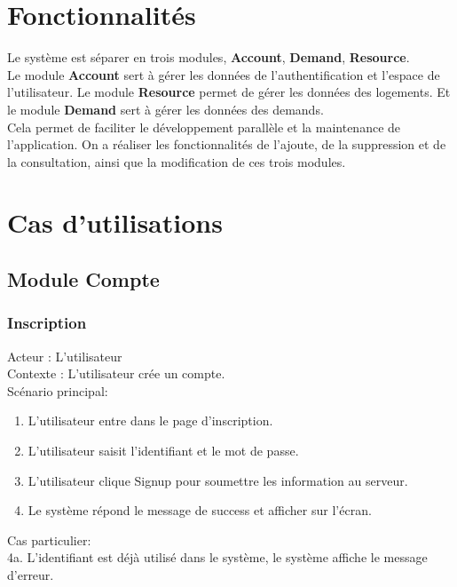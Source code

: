 \documentclass[14px]{article}
\begin{document}
\section{Fonctionnalités}
Le système est séparer en trois modules, \textbf{Account}, \textbf{Demand}, \textbf{Resource}. \\
Le module \textbf{Account} sert à gérer les données de l'authentification et l'espace de l'utilisateur. Le module \textbf{Resource} permet de gérer les données des logements. Et le module \textbf{Demand} sert à gérer les données des demands.\\
Cela permet de faciliter le développement parallèle et la maintenance de l'application. On a réaliser les fonctionnalités de l'ajoute, de la suppression et de la consultation, ainsi que la modification de ces trois modules. 


\section{Cas d'utilisations}
\subsection{Module Compte}
\subsubsection{Inscription}
Acteur : L'utilisateur\\
Contexte : L'utilisateur crée un compte.\\
Scénario principal:
\begin{enumerate}
	\item L'utilisateur entre dans le page d'inscription.
	\item L'utilisateur saisit l'identifiant et le mot de passe.
	\item L'utilisateur clique Signup pour soumettre les information au serveur.
	\item Le système répond le message de success et afficher sur l'écran.
\end{enumerate}
Cas particulier:\\
4a. L'identifiant est déjà utilisé dans le système, le système affiche le message d'erreur.
\end{document}
